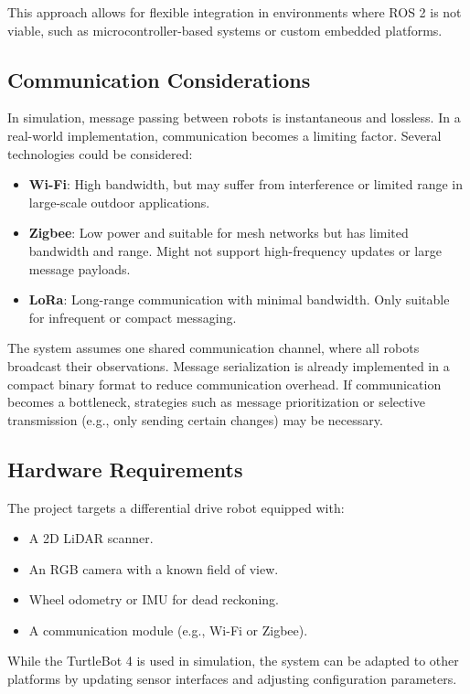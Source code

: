 This approach allows for flexible integration in environments where ROS 2 is not viable, such as microcontroller-based systems or custom embedded platforms.

\subsection{Communication Considerations}
In simulation, message passing between robots is instantaneous and lossless. 
In a real-world implementation, communication becomes a limiting factor. 
Several technologies could be considered:

\begin{itemize}
  \item \textbf{Wi-Fi}: High bandwidth, but may suffer from interference or limited range in large-scale outdoor applications.
  \item \textbf{Zigbee}: Low power and suitable for mesh networks but has limited bandwidth and range. Might not support high-frequency updates or large message payloads.
  \item \textbf{LoRa}: Long-range communication with minimal bandwidth. Only suitable for infrequent or compact messaging.
\end{itemize}

The system assumes one shared communication channel, where all robots broadcast their observations. 
Message serialization is already implemented in a compact binary format to reduce communication overhead. 
If communication becomes a bottleneck, strategies such as message prioritization or selective transmission (e.g., only sending certain changes) may be necessary.

\subsection{Hardware Requirements}
The project targets a differential drive robot equipped with:
\begin{itemize}
  \item A 2D LiDAR scanner.
  \item An RGB camera with a known field of view.
  \item Wheel odometry or IMU for dead reckoning.
  \item A communication module (e.g., Wi-Fi or Zigbee).
\end{itemize}

While the TurtleBot 4 is used in simulation, the system can be adapted to other platforms by updating sensor interfaces and adjusting configuration parameters.

